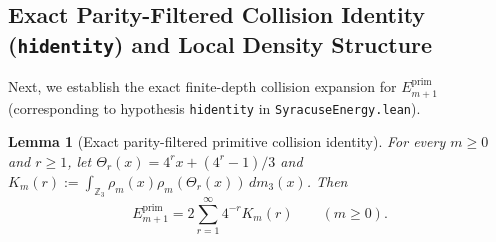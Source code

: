 \documentclass[11pt,a4paper]{article}
\numberwithin{equation}{section}
\newtheorem{lemma}[theorem]{Lemma}
\theoremstyle{definition}
\theoremstyle{remark}
\newcommand{\Z}{\mathbb{Z}}
\newcommand{\prim}{\mathrm{prim}}
\begin{document}
\subsection{Exact Parity-Filtered Collision Identity (\texttt{hidentity}) and Local Density Structure}\label{subsec:collision_and_local_density}

Next, we establish the exact finite-depth collision expansion for $E_{m+1}^{\prim}$ (corresponding to hypothesis \texttt{hidentity} in \texttt{SyracuseEnergy.lean}).

\begin{lemma}[Exact parity-filtered primitive collision identity]\label{lem:collision_identity_bridge}
For every $m \ge 0$ and $r \ge 1$, let $\Theta_r(x) = 4^r x + (4^r - 1)/3$ and $K_m(r) := \int_{\Z_3} \rho_m(x)\rho_m(\Theta_r(x))\,dm_3(x)$. Then
\begin{equation}\label{eq:primitive-collision-identity}
 E_{m+1}^{\prim} = 2\sum_{r=1}^\infty 4^{-r} K_m(r) \qquad (m \ge 0).
\end{equation}
\end{lemma}
\end{document}
